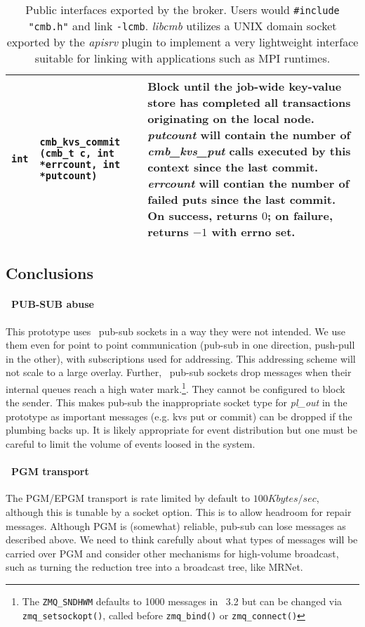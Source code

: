 \begin{table}
\begin{tabular}{|p{0.7cm}p{5cm}|p{9cm}|}
{\tt int}
  & {\tt cmb\_kvs\_commit (cmb\_t c, int *errcount, int *putcount)}
  & Block until the job-wide key-value store has completed all transactions
    originating on the local node.  {\em putcount} will contain the number
    of {\em cmb\_kvs\_put} calls executed by this context since the last commit.
    {\em errcount} will contian the number of failed puts since the last commit.
    On success, returns $0$; on failure, returns $-1$ with errno set.\\
\hline
\end{tabular}
\caption{Public interfaces exported by the broker.  Users would
{\tt \#include "cmb.h"} and link {\tt -lcmb}.  {\em libcmb} utilizes
a UNIX domain socket exported by the {\em apisrv} plugin to implement
a very lightweight interface suitable for linking with applications such
as MPI runtimes.}
\label{tab:cmbapi}
\end{table}

\subsection{Conclusions}

\paragraph{\zMQ\ PUB-SUB abuse} This prototype uses \zMQ\ pub-sub sockets
in a way they were not intended.   We use them even for point to point
communication (pub-sub in one direction, push-pull in the other),
with subscriptions used for addressing.  This addressing scheme will not
scale to a large overlay.  Further, \zMQ\ pub-sub sockets drop messages when
their internal queues reach a high water mark.\footnote{The {\tt ZMQ\_SNDHWM}
defaults to 1000 messages in \zMQ\ 3.2 but can be changed via
{\tt zmq\_setsockopt()}, called before {\tt zmq\_bind()} or
{\tt zmq\_connect()}}.
They cannot be configured to block the sender.  This makes pub-sub
the inappropriate socket type for {\em pl\_out} in the prototype as
important messages (e.g. kvs put or commit) can be dropped if the
plumbing backs up.
It is likely appropriate for event distribution but one must be careful
to limit the volume of events loosed in the system.

\paragraph{\zMQ\ PGM transport}  The PGM/EPGM transport is rate limited by
default to $100 Kbytes/sec$, although this is tunable by a socket option.
This is to allow headroom for repair messages.
Although PGM is (somewhat) reliable, pub-sub can lose messages as described
above.
We need to think carefully about what types of messages will be carried
over PGM and consider other mechanisms for high-volume broadcast,
such as turning the reduction tree into a broadcast tree, like MRNet.

